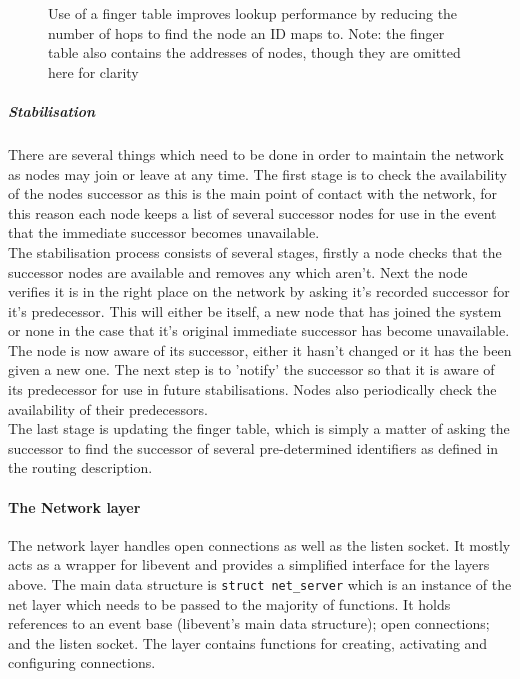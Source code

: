 \documentclass{article}
\begin{document}
\begin{figure}
\centering
\def\svgwidth{0.95\columnwidth}

\caption[caption]{Use of a finger table improves lookup performance by reducing the number of hops to find the node an ID maps to.
Note: the finger table also contains the addresses of nodes, though they are omitted here for clarity}
\label{fig:fingersRbttr}
\end{figure}


\subparagraph{Stabilisation} There are several things which need to be done in order to maintain the network as nodes may join or leave at any time. The first stage is to check the availability of the nodes successor as this is the main point of contact with the network, for this reason each node keeps a list of several successor nodes for use in the event that the immediate successor becomes unavailable.
\\
The stabilisation process consists of several stages, firstly a node checks that the successor nodes are available and removes any which aren't.
Next the node verifies it is in the right place on the network by asking it's recorded successor for it's predecessor. This will either be itself, a new node that has joined the system or none in the case that it's original immediate successor has become unavailable. The node is now aware of its successor, either it hasn't changed or it has the been given a new one. The next step is to 'notify' the successor so that it is aware of its predecessor for use in future stabilisations.
Nodes also periodically check the availability of their predecessors.
\\
The last stage is updating the finger table, which is simply a matter of asking the successor to find the successor of several pre-determined identifiers as defined in the routing description.



\paragraph{The Network layer}
The network layer handles open connections as well as the listen socket. It mostly acts as a wrapper for libevent and provides a simplified interface for the layers above. The main data structure is \texttt{struct net\_server} which is an instance of the net layer which needs to be passed to the majority of functions. It holds references to an event base (libevent's main data structure); open connections; and the listen socket. The layer contains functions for creating, activating and configuring connections.
\end{document}
